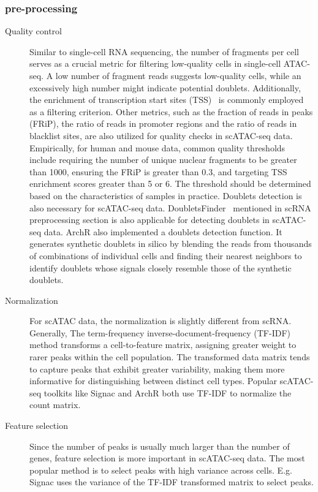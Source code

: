 \subsubsection{pre-processing}
\begin{description}
	\item[Quality control] 
	Similar to single-cell RNA sequencing, the number of fragments per cell serves as a crucial metric for filtering low-quality cells in single-cell ATAC-seq. A low number of fragment reads suggests low-quality cells, while an excessively high number might indicate potential doublets. Additionally, the enrichment of transcription start sites (TSS)~\citep{Granja2021} is commonly employed as a filtering criterion. Other metrics, such as the fraction of reads in peaks (FRiP), the ratio of reads in promoter regions and the ratio of reads in blacklist sites, are also utilized for quality checks in scATAC-seq data. Empirically, for human and mouse data, common quality thresholds include requiring the number of unique nuclear fragments to be greater than 1000, ensuring the FRiP is greater than 0.3, and targeting TSS enrichment scores greater than 5 or 6. The threshold should be determined based on the characteristics of samples in practice. Doublets detection is also necessary for scATAC-seq data. DoubletsFinder~\citep{mcginnis2019doubletfinder} mentioned in scRNA preprocessing section is also applicable for detecting doublets in scATAC-seq data. ArchR\citep{Granja2021} also implemented a doublets detection function. It generates synthetic doublets in silico by blending the reads from thousands of combinations of individual cells and finding their nearest neighbors to identify doublets whose signals closely resemble those of the synthetic doublets.
	
	\item[Normalization] 
	For scATAC data, the normalization is slightly different from scRNA. Generally, The term-frequency inverse-document-frequency (TF-IDF) method transforms a cell-to-feature matrix, assigning greater weight to rarer peaks within the cell population. The transformed data matrix tends to capture peaks that exhibit greater variability, making them more informative for distinguishing between distinct cell types. Popular scATAC-seq toolkits like Signac and ArchR both use TF-IDF to normalize the count matrix.
	
	\item[Feature selection] 
	Since the number of peaks is usually much larger than the number of genes, feature selection is more important in scATAC-seq data. The most popular method is to select peaks with high variance across cells. E.g. Signac uses the variance of the TF-IDF transformed matrix to select peaks. 
\end{description}
